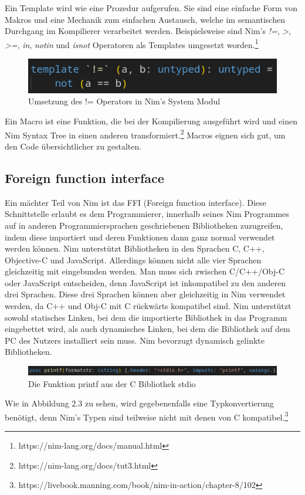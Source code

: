 \documentclass[11pt]{report}
\begin{document}
Ein Template wird wie eine Prozedur aufgerufen. Sie sind eine einfache Form von Makros und eine Mechanik zum einfachen Austausch, welche im semantischen Durchgang im Kompilierer verarbeitet werden. Beispielsweise sind Nim's \emph{!=}, \emph{>}, \emph{>=}, \emph{in}, \emph{notin} und \emph{isnot} Operatoren als Templates umgesetzt worden.\footnote{https://nim-lang.org/docs/manual.html}
\begin{figure}[htp]
\centering
\includegraphics[scale=0.50]{images/image2.png}
\caption{Umsetzung des != Operators in Nim's System Modul}
\label{}
\end{figure}

Ein Macro ist eine Funktion, die bei der Kompilierung ausgeführt wird und einen Nim Syntax Tree in einen anderen transformiert.\footnote{https://nim-lang.org/docs/tut3.html} Macros eignen sich gut, um den Code übersichtlicher zu gestalten.

\subsection{Foreign function interface}
Ein mächter Teil von Nim ist das FFI (Foreign function interface). Diese Schnittstelle erlaubt es dem Programmierer, innerhalb seines Nim Programmes auf in anderen Programmiersprachen geschriebenen Bibliotheken zuzugreifen, indem diese importiert und deren Funktionen dann ganz normal verwendet werden können. Nim unterstützt Bibliotheken in den Sprachen C, C++, Objective-C und JavaScript. Allerdings können nicht alle vier Sprachen gleichzeitig mit eingebunden werden. Man muss sich zwischen C/C++/Obj-C oder JavaScript entscheiden, denn JavaScript ist inkompatibel zu den anderen drei Sprachen. Diese drei Sprachen können aber gleichzeitig in Nim verwendet werden, da C++ und Obj-C mit C rückwärts kompatibel sind.
Nim unterstützt sowohl statisches Linken, bei dem die importierte Bibliothek in das Programm eingebettet wird, als auch dynamisches Linken, bei dem die Bibliothek auf dem PC des Nutzers installiert sein muss. Nim bevorzugt dynamisch gelinkte Bibliotheken.
\begin{figure}[htp]
\centering
\includegraphics[scale=0.40]{images/image3.png}
\caption{Die Funktion printf aus der C Bibliothek stdio}
\label{}
\end{figure}
Wie in Abbildung 2.3 zu sehen, wird gegebenenfalls eine Typkonvertierung benötigt, denn Nim's Typen sind teilweise nicht mit denen von C kompatibel.\footnote{https://livebook.manning.com/book/nim-in-action/chapter-8/102}
\end{document}
